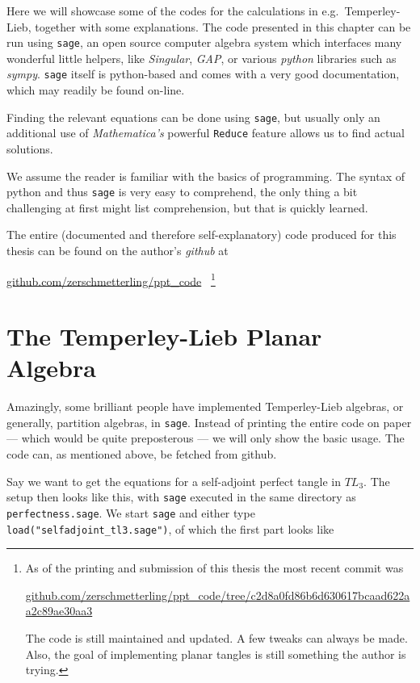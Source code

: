 \label{App: Code}

Here we will showcase some of the codes for the calculations in e.g.\ Temperley-Lieb, together with some explanations. The code presented in this chapter\footnotemark{} can be run using \texttt{sage}, an open source computer algebra system which interfaces many wonderful little helpers, like \emph{Singular}, \emph{GAP}, or various \emph{python} libraries such as \emph{sympy}. \texttt{sage} itself is python-based and comes with a very good documentation, which may readily be found on-line.

Finding the relevant equations can be done using \texttt{sage}, but usually only an additional use of \emph{Mathematica's} powerful \texttt{Reduce} feature allows us to find actual solutions.

We assume the reader is familiar with the basics of programming. The syntax of python and thus \texttt{sage} is very easy to comprehend, the only thing a bit challenging at first might list  comprehension, but that is quickly learned.

The entire (documented and therefore self-explanatory) code produced for this thesis can be found on the author's \emph{github} at
\begin{center}
\url{github.com/zerschmetterling/ppt_code}~
	\footnote{As of the printing and submission of this thesis the most recent commit was 
		\begin{center}
			\url{github.com/zerschmetterling/ppt_code/tree/c2d8a0fd86b6d630617bcaad622aa2c89ae30aa3}
		\end{center}
		The code is still maintained and updated. A few tweaks can always be made. Also, the goal of implementing planar tangles is still something the author is trying.
		}
\end{center}


\section*{The Temperley-Lieb Planar Algebra}
Amazingly, some brilliant people have implemented Temperley-Lieb algebras, or generally, partition algebras, in \texttt{sage}. Instead of printing the entire code on paper --- which would be 	quite preposterous --- we will only show the basic usage. The code can, as mentioned above, be fetched from github.

Say we want to get the equations for a self-adjoint perfect tangle in $TL_3$. The setup then looks like this, with \texttt{sage} executed in the same directory as \texttt{perfectness.sage}. We start \texttt{sage} and either type \texttt{load("selfadjoint\_tl3.sage")}, of which the first part looks like


